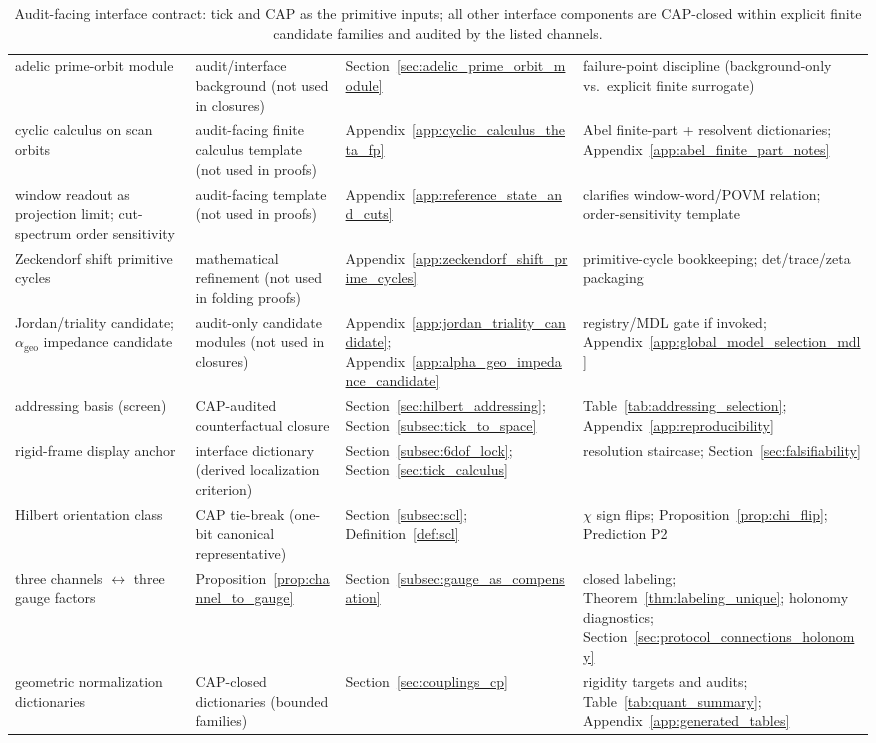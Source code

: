 \begin{table}[t]
\begin{tabular}{p{} p{} p{} p{}}
adelic prime-orbit module & audit/interface background (not used in closures) & Section~\ref{sec:adelic_prime_orbit_module} & failure-point discipline (background-only vs.\ explicit finite surrogate) \\
cyclic calculus on scan orbits & audit-facing finite calculus template (not used in proofs) & Appendix~\ref{app:cyclic_calculus_theta_fp} & Abel finite-part + resolvent dictionaries; Appendix~\ref{app:abel_finite_part_notes} \\
window readout as projection limit; cut-spectrum order sensitivity & audit-facing template (not used in proofs) & Appendix~\ref{app:reference_state_and_cuts} & clarifies window-word/POVM relation; order-sensitivity template \\
Zeckendorf shift primitive cycles & mathematical refinement (not used in folding proofs) & Appendix~\ref{app:zeckendorf_shift_prime_cycles} & primitive-cycle bookkeeping; det/trace/zeta packaging \\
Jordan/triality candidate; $\alpha_{\mathrm{geo}}$ impedance candidate & audit-only candidate modules (not used in closures) & Appendix~\ref{app:jordan_triality_candidate}; Appendix~\ref{app:alpha_geo_impedance_candidate} & registry/MDL gate if invoked; Appendix~\ref{app:global_model_selection_mdl} \\
addressing basis (screen) & CAP-audited counterfactual closure & Section~\ref{sec:hilbert_addressing}; Section~\ref{subsec:tick_to_space} & Table~\ref{tab:addressing_selection}; Appendix~\ref{app:reproducibility} \\
rigid-frame display anchor & interface dictionary (derived localization criterion) & Section~\ref{subsec:6dof_lock}; Section~\ref{sec:tick_calculus} & resolution staircase; Section~\ref{sec:falsifiability} \\
Hilbert orientation class & CAP tie-break (one-bit canonical representative) & Section~\ref{subsec:scl}; Definition~\ref{def:scl} & $\chi$ sign flips; Proposition~\ref{prop:chi_flip}; Prediction P2 \\
three channels $\leftrightarrow$ three gauge factors & Proposition~\ref{prop:channel_to_gauge} & Section~\ref{subsec:gauge_as_compensation} & closed labeling; Theorem~\ref{thm:labeling_unique}; holonomy diagnostics; Section~\ref{sec:protocol_connections_holonomy} \\
geometric normalization dictionaries & CAP-closed dictionaries (bounded families) & Section~\ref{sec:couplings_cp} & rigidity targets and audits; Table~\ref{tab:quant_summary}; Appendix~\ref{app:generated_tables} \\
\bottomrule
\end{tabular}
\caption{Audit-facing interface contract: tick and CAP as the primitive inputs; all other interface components are CAP-closed within explicit finite candidate families and audited by the listed channels.}
\label{tab:audit_facing_contract}
\end{table}


